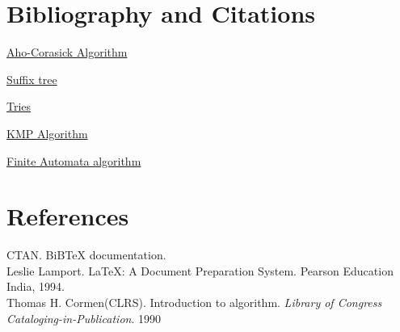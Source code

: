 \documentclass[11pt,a4paper]{article}
\begin{document}
\section{Bibliography and Citations}
\label{sec:biblio}

\href{https://www.geeksforgeeks.org/aho-corasick-algorithm-pattern-searching/}{Aho-Corasick Algorithm}

\href{https://www.geeksforgeeks.org/pattern-searching-using-suffix-tree/}{Suffix tree}

\href{https://www.geeksforgeeks.org/pattern-searching-using-trie-suffixes/}{Tries}

\href{https://www.geeksforgeeks.org/kmp-algorithm-for-pattern-searching/}{KMP Algorithm}

\href{https://www.geeksforgeeks.org/finite-automata-algorithm-for-pattern-searching/}{Finite Automata algorithm}

\section{References}
\label{sec:refrnces}

CTAN. BiBTeX documentation.
\\
Leslie Lamport. LaTeX: A Document Preparation System. Pearson Education India, 1994.
\\
Thomas H. Cormen(CLRS). Introduction to algorithm.\emph{ Library of Congress Cataloging-in-Publication}. 1990
\end{document}
